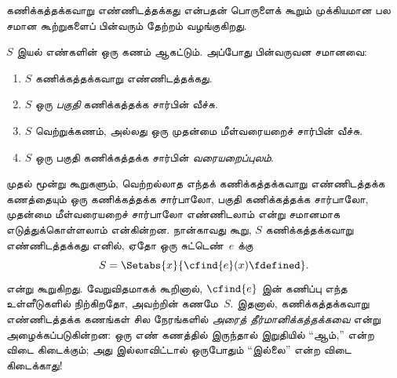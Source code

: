 \documentclass[../../../include/open-logic-section]{subfiles}
\begin{document}




கணிக்கத்தக்கவாறு எண்ணிடத்தக்கது என்பதன் பொருளைக் கூறும் முக்கியமான
பல சமான கூற்றுகளைப் பின்வரும் தேற்றம் வழங்குகிறது.

\begin{thm}
$S$ இயல் எண்களின் ஒரு கணம் ஆகட்டும். அப்போது பின்வருவன சமானவை:
\begin{enumerate}
\item{} $S$ கணிக்கத்தக்கவாறு எண்ணிடத்தக்கது.
\item{} $S$ ஒரு \emph{பகுதி} கணிக்கத்தக்க சார்பின் வீச்சு.
\item{} $S$ வெற்றுக்கணம், அல்லது ஒரு முதன்மை
  மீள்வரையறைச் சார்பின் வீச்சு.
\item{} $S$ ஒரு பகுதி கணிக்கத்தக்க சார்பின்
  \emph{வரையறைப்புலம்}.
\end{enumerate}
\end{thm}

\begin{explain}
முதல் மூன்று கூறுகளும், வெற்றல்லாத எந்தக் கணிக்கத்தக்கவாறு
எண்ணிடத்தக்க கணத்தையும் ஒரு கணிக்கத்தக்க சார்பாலோ, பகுதி
கணிக்கத்தக்க சார்பாலோ, முதன்மை மீள்வரையறைச் சார்பாலோ எண்ணிடலாம்
என்று சமானமாக எடுத்துக்கொள்ளலாம் என்கின்றன. நான்காவது கூறு,
$S$ கணிக்கத்தக்கவாறு எண்ணிடத்தக்கது எனில், ஏதோ ஒரு சுட்டெண்~$e$ க்கு
\[
S = \Setabs{x}{\cfind{e}(x) \fdefined}.
\]
என்று கூறுகிறது. வேறுவிதமாகக் கூறினால், $\cfind{e}$ இன் கணிப்பு
எந்த உள்ளீடுகளில் நிற்கிறதோ, அவற்றின் கணமே~$S$. இதனால்,
கணிக்கத்தக்கவாறு எண்ணிடத்தக்க கணங்கள் சில நேரங்களில்
\emph{அரைத் தீர்மானிக்கத்தக்கவை} என்று அழைக்கப்படுகின்றன:
ஒரு எண் கணத்தில் இருந்தால் இறுதியில் ``ஆம்,'' என்ற விடை கிடைக்கும்;
அது இல்லாவிட்டால் ஒருபோதும் ``இல்லை'' என்ற விடை கிடைக்காது!{}
\end{explain}
\end{document}
